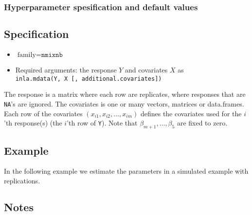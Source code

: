 \documentclass[a4paper,11pt]{article}
\def\mmax{5}
\begin{document}
\subsubsection*{Hyperparameter spesification and default values}


\subsection*{Specification}

\begin{itemize}
\item $\text{family}=\texttt{nmixnb}$
\item Required arguments: the response $Y$ and covariates $X$ as\\
    \verb|inla.mdata(Y, X [, additional.covariates])|
\end{itemize}
The response is a matrix where each row are replicates, where
responses that are \texttt{NA}'s are ignored. The covariates is one or
many vectors, matrices or data.frames. Each row of the covariates
$(x_{i1}, x_{i2}, \ldots, x_{im})$ defines the covariates used for the
$i$'th response(s) (the $i$'th row of \texttt{Y}). Note that 
$\beta_{m+1}, \ldots, \beta_{\mmax}$ are fixed to zero.


\subsection*{Example}

In the following example we estimate the parameters in a simulated
example with replications.



\subsection*{Notes}
\end{document}
